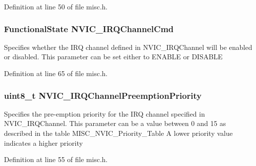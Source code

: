 Definition at line 50 of file misc.\-h.

\hypertarget{struct_n_v_i_c___init_type_def_a3c5567ef024a0489884083c88f17b4d5}{
\subsubsection[{N\-V\-I\-C\-\_\-\-I\-R\-Q\-Channel\-Cmd}]{\setlength{\rightskip}{0pt plus 5cm}Functional\-State N\-V\-I\-C\-\_\-\-I\-R\-Q\-Channel\-Cmd}}\label{struct_n_v_i_c___init_type_def_a3c5567ef024a0489884083c88f17b4d5}
Specifies whether the I\-R\-Q channel defined in N\-V\-I\-C\-\_\-\-I\-R\-Q\-Channel will be enabled or disabled. This parameter can be set either to E\-N\-A\-B\-L\-E or D\-I\-S\-A\-B\-L\-E 

Definition at line 65 of file misc.\-h.

\hypertarget{struct_n_v_i_c___init_type_def_aa395d7151e569272cbcf04420a1a4128}{
\subsubsection[{N\-V\-I\-C\-\_\-\-I\-R\-Q\-Channel\-Preemption\-Priority}]{\setlength{\rightskip}{0pt plus 5cm}uint8\-\_\-t N\-V\-I\-C\-\_\-\-I\-R\-Q\-Channel\-Preemption\-Priority}}\label{struct_n_v_i_c___init_type_def_aa395d7151e569272cbcf04420a1a4128}
Specifies the pre-\/emption priority for the I\-R\-Q channel specified in N\-V\-I\-C\-\_\-\-I\-R\-Q\-Channel. This parameter can be a value between 0 and 15 as described in the table M\-I\-S\-C\-\_\-\-N\-V\-I\-C\-\_\-\-Priority\-\_\-\-Table A lower priority value indicates a higher priority 

Definition at line 55 of file misc.\-h.

